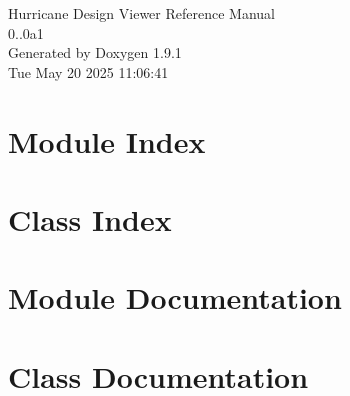 \documentclass[a4paper]{asimbook}
\begin{document}
   \begin{titlepage}
     \vspace*{7cm}
     \begin{center}
     {\Large Hurricane Design Viewer Reference Manual\\[1ex]\large 0..\+0a1 }\\
     \vspace*{1cm}
     {\large Generated by Doxygen 1.9.1}\\
     \vspace*{0.5cm}
     {\small Tue May 20 2025 11:06:41}\\
     \end{center}
   \end{titlepage}

   \clearemptydoublepage

   \tableofcontents
   \clearemptydoublepage

\chapter{Module Index}

\chapter{Class Index}

\chapter{Module Documentation}

\chapter{Class Documentation}








\backmatter
\newpage
{}
\clearemptydoublepage
{}
\printindex
\end{document}
